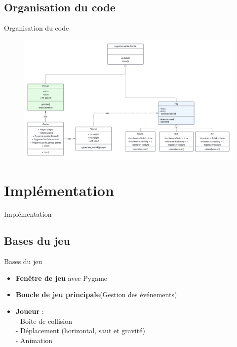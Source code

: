 \documentclass[aspectratio=169]{beamer}
\begin{document}
\subsection{Organisation du code}

\begin{frame}{Organisation du code}
    \begin{figure}
        \includegraphics[height=0.8\textheight]{assets/UML_class.png}
    \end{figure}
\end{frame}


\section{Implémentation}

\begin{frame}{Implémentation}
    \tableofcontents[sections={4}]
\end{frame}

\subsection{Bases du jeu}

\begin{frame}{Bases du jeu}
    \centering
    \begin{itemize}
        \item \textbf{Fenêtre de jeu} avec Pygame
        \item \textbf{Boucle de jeu principale}(Gestion des événements)
        \item \textbf{Joueur} : \\
        - Boîte de collision\\
        - Déplacement (horizontal, saut et gravité)\\
        - Animation
        
    \end{itemize}
\end{frame}
\end{document}
